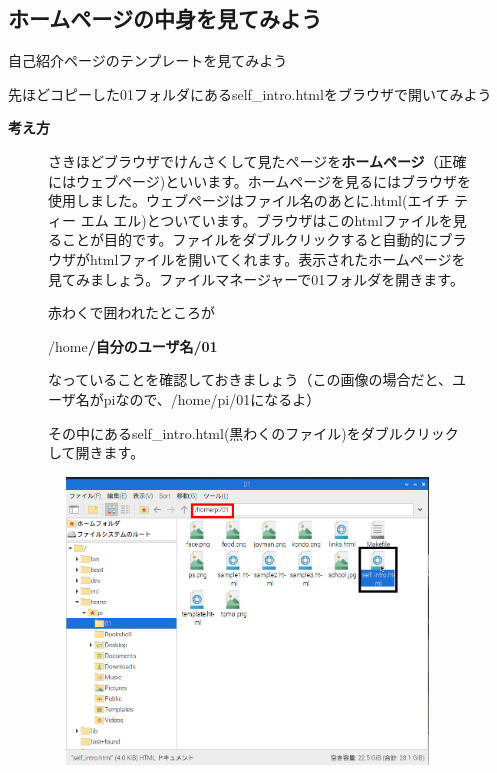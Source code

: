 \documentclass[a4paper,12pt]{jarticle}
\begin{document}
\bigskip

\clearpage
{}
\subsection{\theExercise ホームページの中身を見てみよう}
自己紹介ページのテンプレートを見てみよう

先ほどコピーした01フォルダにあるself\_intro.htmlをブラウザで開いてみよう

\textbf{考え方}



\begin{figure}[hb]
  \centering
  \begin{minipage}{16.576cm}
    さきほどブラウザでけんさくして見たページを\textbf{ホームページ}（正確にはウェブページ)といいます。ホームページを見るにはブラウザを使用しました。ウェブページはファイル名のあとに.html(エイチ
    ティー エム
    エル)とついています。ブラウザはこのhtmlファイルを見ることが目的です。ファイルをダブルクリックすると自動的にブラウザがhtmlファイルを開いてくれます。表示されたホームページを見てみましょう。ファイルマネージャーで01フォルダを開きます。

    赤わくで囲われたところが

    /home\textbf{/自分のユーザ名/01}

    なっていることを確認しておきましょう（この画像の場合だと、ユーザ名がpiなので、/home/pi/01になるよ）

    その中にあるself\_intro.html(黒わくのファイル)をダブルクリックして開きます。




    \bigskip
  \end{minipage}

  \includegraphics[width=10.559cm,height=7.634cm]{textbook-img141.png}

\end{figure}
\end{document}
